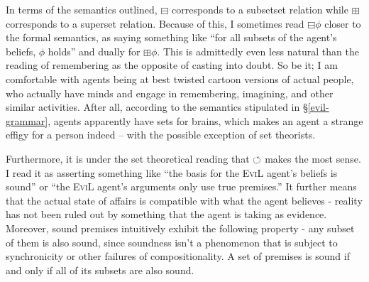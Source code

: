 In terms of the semantics outlined, $\boxminus$ corresponds to a subsetset
relation while $\boxplus$ corresponds to a superset relation.  Because of
this, I sometimes read $\boxminus \phi$ closer to the formal semantics, as
saying something like ``for all subsets of the agent's beliefs, $\phi$ holds''
and dually for $\boxplus \phi$.  This is admittedly even less natural than
the reading of remembering as the opposite of casting into doubt.  So be it;
I am comfortable with  agents being at best twisted cartoon
versions of actual people, who actually have minds and engage in remembering,
imagining, and other similar activities.  After all, according to the
semantics stipulated in \S\ref{evil-grammar},  agents apparently have sets
for brains, which makes an  agent a strange effigy for a person
indeed -- with the possible exception of set theorists.

Furthermore, it is under the set theoretical reading that $\circlearrowleft$ makes
the most sense.  I read it as asserting something like ``the basis for
the \textsc{EviL} agent's beliefs is sound'' or ``the \textsc{EviL}
agent's arguments only use true premises.''  It further means that the
actual state of affairs is compatible with what the agent believes -
reality has not been ruled out by something that the agent is taking
as evidence.  Moreover, sound premises intuitively exhibit the
following property - any subset of them is also sound, since soundness
isn't a phenomenon that is subject to synchronicity or other failures
of compositionality.  A set of premises is sound if and only if all of
its subsets are also sound.

% 

